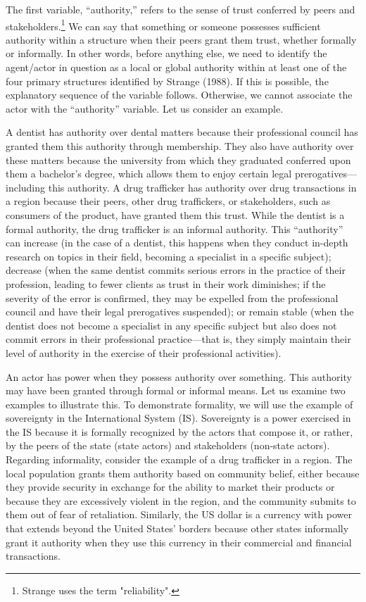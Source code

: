 The first variable, “authority,” refers to the sense of trust conferred by peers and stakeholders.\footnote{Strange uses the term "reliability".} We can say that something or someone possesses sufficient authority within a structure when their peers grant them trust, whether formally or informally. In other words, before anything else, we need to identify the agent/actor in question as a local or global authority within at least one of the four primary structures identified by Strange (1988). If this is possible, the explanatory sequence of the variable follows. Otherwise, we cannot associate the actor with the ``authority'' variable. Let us consider an example.

A dentist has authority over dental matters because their professional council has granted them this authority through membership. They also have authority over these matters because the university from which they graduated conferred upon them a bachelor's degree, which allows them to enjoy certain legal prerogatives---including this authority. A drug trafficker has authority over drug transactions in a region because their peers, other drug traffickers, or stakeholders, such as consumers of the product, have granted them this trust. While the dentist is a formal authority, the drug trafficker is an informal authority. This ``authority'' can increase (in the case of a dentist, this happens when they conduct in-depth research on topics in their field, becoming a specialist in a specific subject); decrease (when the same dentist commits serious errors in the practice of their profession, leading to fewer clients as trust in their work diminishes; if the severity of the error is confirmed, they may be expelled from the professional council and have their legal prerogatives suspended); or remain stable (when the dentist does not become a specialist in any specific subject but also does not commit errors in their professional practice---that is, they simply maintain their level of authority in the exercise of their professional activities).

An actor has power when they possess authority over something. This authority may have been granted through formal or informal means. Let us examine two examples to illustrate this. To demonstrate formality, we will use the example of sovereignty in the International System (IS). Sovereignty is a power exercised in the IS because it is formally recognized by the actors that compose it, or rather, by the peers of the state (state actors) and stakeholders (non-state actors). Regarding informality, consider the example of a drug trafficker in a region. The local population grants them authority based on community belief, either because they provide security in exchange for the ability to market their products or because they are excessively violent in the region, and the community submits to them out of fear of retaliation. Similarly, the US dollar is a currency with power that extends beyond the United States' borders because other states informally grant it authority when they use this currency in their commercial and financial transactions.

